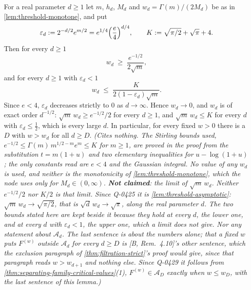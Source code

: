 \begin{lemma}
\label{lem:threshold-limit}
\leanok
For a real parameter $d \ge 1$ let $m$, $h_d$, $M_d$ and $w_d = \Gamma(m)/(2M_d)$ be as in
\ref{lem:threshold-monotone}, and put
\[
  \varepsilon_d := 2^{-d/2}e^{m/2} = e^{1/4}\Bigl(\frac e4\Bigr)^{d/4},
  \qquad K := \sqrt{\pi/2} + \sqrt\pi + 4 .
\]
Then for every $d \ge 1$
\[
  w_d \;\ge\; \frac{e^{-1/2}}{2\sqrt m},
\]
and for every $d \ge 1$ with $\varepsilon_d < 1$
\[
  w_d \;\le\; \frac{K}{2(1-\varepsilon_d)\sqrt m} .
\]
Since $e < 4$, $\varepsilon_d$ decreases strictly to $0$ as $d \to \infty$. Hence
$w_d \to 0$, and $w_d$ is of exact order $d^{-1/2}$: $\sqrt m\,w_d \ge e^{-1/2}/2$ for every
$d \ge 1$, and $\sqrt m\,w_d \le K$ for every $d$ with $\varepsilon_d \le \tfrac12$, which is every
large $d$. In particular, for every fixed $w > 0$ there is a $D$ with $w > w_d$ for all
$d \ge D$.
\statusT\quad\emph{(Cites nothing. The Stirling bounds used, $e^{-1/2} \le
\Gamma(m)\,m^{1/2-m}e^m \le K$ for $m \ge 1$, are proved in the proof from the substitution
$t = m(1+u)$ and two elementary inequalities for $u - \log(1+u)$; the only constants read are
$e < 4$ and the Gaussian integral. No value of any $w_d$ is used, and neither is the monotonicity
of \ref{lem:threshold-monotone}, which the node \emph{uses} only for $M_d \in (0,\infty)$.
\textbf{Not claimed}: the limit of $\sqrt m\,w_d$. Neither $e^{-1/2}/2$ nor $K/2$ is that limit.
Since Q-0425 it is \ref{lem:threshold-asymptotic}: $\sqrt m\,w_d \to \sqrt{\pi/2}$, that is
$\sqrt d\,w_d \to \sqrt\pi$, along the real parameter $d$. The two bounds stated here are kept
beside it because they hold at every $d$, the lower one, and at every $d$ with
$\varepsilon_d < 1$, the upper one, which a limit does not give. Nor any statement about
$\mathcal{A}_d$. The last sentence is about
the numbers alone; that a fixed $w$ puts $F^{(w)}$ outside $\mathcal{A}_d$ for every $d \ge D$ is
[B, Rem.~4.10]'s other sentence, which the exclusion paragraph of \ref{thm:filtration-strict}'s
proof would give, since that paragraph reads $w > w_{d+1}$ and nothing else. Since Q-0429 it
follows from \ref{thm:separating-family-critical-values}(1), $F^{(w)} \in \mathcal{A}_D$ exactly
when $w \le w_D$, with the last sentence of this lemma.)}
\end{lemma}

